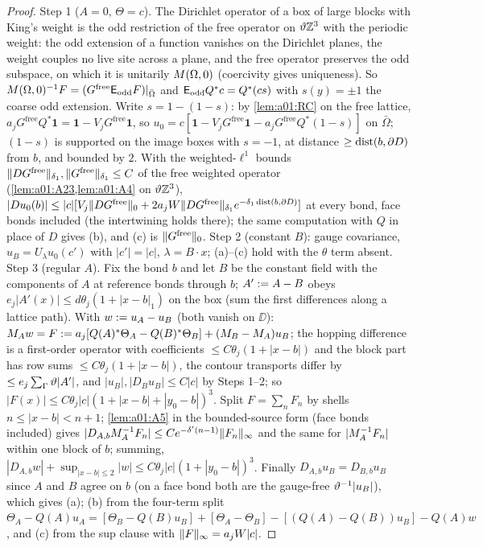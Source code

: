 \begin{proof}
Step 1 ($A=0$, $\Theta=c$). The Dirichlet operator of a box of large blocks with King's weight is the odd restriction of the free operator on $\vartheta\mathbb Z^3$ with the periodic weight: the odd extension of a function vanishes on the Dirichlet planes, the weight couples no live site across a plane, and the free operator preserves the odd subspace, on which it is unitarily $M(\Omega,0)$ (coercivity gives uniqueness). So $M(\Omega,0)^{-1}F=(G^{\mathrm{free}}\mathsf E_{\mathrm{odd}}F)|_{\bar\Omega}$ and $\mathsf E_{\mathrm{odd}}Q^*c=Q^*(cs)$ with $s(y)=\pm1$ the coarse odd extension. Write $s=1-(1-s)$: by \cref{lem:a01:RC} on the free lattice, $a_jG^{\mathrm{free}}Q^*\mathbf 1=\mathbf 1-V_jG^{\mathrm{free}}\mathbf 1$, so $u_0=c[\mathbf 1-V_jG^{\mathrm{free}}\mathbf 1-a_jG^{\mathrm{free}}Q^*(1-s)]$ on $\bar\Omega$; $(1-s)$ is supported on the image boxes with $s=-1$, at distance $\ge\operatorname{dist}(b,\partial D)$ from $b$, and bounded by $2$. With the weighted-$\ell^1$ bounds $\lVert DG^{\mathrm{free}}\rVert_{\delta_1},\lVert G^{\mathrm{free}}\rVert_{\delta_1}\le C$ of the free weighted operator (\cref{lem:a01:A23,lem:a01:A4} on $\vartheta\mathbb Z^3$), $|Du_0(b)|\le|c|[V_j\lVert DG^{\mathrm{free}}\rVert_0+2a_jW\lVert DG^{\mathrm{free}}\rVert_{\delta_1}e^{-\delta_1\operatorname{dist}(b,\partial D)}]$ at every bond, face bonds included (the intertwining holds there); the same computation with $Q$ in place of $D$ gives (b), and (c) is $\lVert G^{\mathrm{free}}\rVert_0$. Step 2 (constant $B$): gauge covariance, $u_B=U_\lambda u_0(c')$ with $|c'|=|c|$, $\lambda=B\cdot x$; (a)--(c) hold with the $\theta$ term absent. Step 3 (regular $A$). Fix the bond $b$ and let $B$ be the constant field with the components of $A$ at reference bonds through $b$; $A':= A-B$ obeys $e_j|A'(x)|\le d\theta_j(1+|x-b|_1)$ on the box (sum the first differences along a lattice path). With $w:= u_A-u_B$ (both vanish on $\DD$): $M_Aw=F:= a_j[Q(A)^*\Theta_A-Q(B)^*\Theta_B]+(M_B-M_A)u_B$; the hopping difference is a first-order operator with coefficients $\le C\theta_j(1+|x-b|)$ and the block part has row sums $\le C\theta_j(1+|x-b|)$, the contour transports differ by $\le e_j\sum_\Gamma\vartheta|A'|$, and $|u_B|,|D_Bu_B|\le C|c|$ by Steps 1--2; so $|F(x)|\le C\theta_j|c|(1+|x-b|+|y_0-b|)^3$. Split $F=\sum_nF_n$ by shells $n\le|x-b|<n+1$; \cref{lem:a01:A5} in the bounded-source form (face bonds included) gives $|D_{A,b}M_A^{-1}F_n|\le Ce^{-\delta'(n-1)}\lVert F_n\rVert_\infty$ and the same for $|M_A^{-1}F_n|$ within one block of $b$; summing, $|D_{A,b}w|+\sup_{|x-b|\le2}|w|\le C\theta_j|c|(1+|y_0-b|)^3$. Finally $D_{A,b}u_B=D_{B,b}u_B$ since $A$ and $B$ agree on $b$ (on a face bond both are the gauge-free $\vartheta^{-1}|u_B|$), which gives (a); (b) from the four-term split $\Theta_A-Q(A)u_A=[\Theta_B-Q(B)u_B]+[\Theta_A-\Theta_B]-[(Q(A)-Q(B))u_B]-Q(A)w$, and (c) from the sup clause with $\lVert F\rVert_\infty=a_jW|c|$.
\end{proof}

